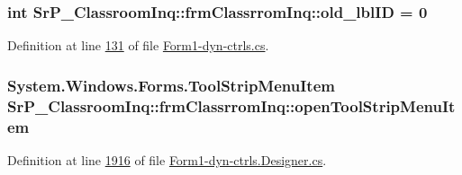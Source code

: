 \hypertarget{class_sr_p___classroom_inq_1_1frm_classrrom_inq_ac56e0f039ce0113331d9bdd322b30827}{
\subsubsection[{old\-\_\-lbl\-I\-D}]{\setlength{\rightskip}{0pt plus 5cm}int {\bf \-Sr\-P\-\_\-\-Classroom\-Inq\-::frm\-Classrrom\-Inq\-::old\-\_\-lbl\-I\-D} = 0}}
\label{class_sr_p___classroom_inq_1_1frm_classrrom_inq_ac56e0f039ce0113331d9bdd322b30827}


\-Definition at line \hyperlink{_form1-dyn-ctrls_8cs_source_l00131}{131} of file \hyperlink{_form1-dyn-ctrls_8cs_source}{\-Form1-\/dyn-\/ctrls.\-cs}.

\hypertarget{class_sr_p___classroom_inq_1_1frm_classrrom_inq_aabb3ca13577ddb31c75bcd459c075263}{
\subsubsection[{open\-Tool\-Strip\-Menu\-Item}]{\setlength{\rightskip}{0pt plus 5cm}\-System.\-Windows.\-Forms.\-Tool\-Strip\-Menu\-Item {\bf \-Sr\-P\-\_\-\-Classroom\-Inq\-::frm\-Classrrom\-Inq\-::open\-Tool\-Strip\-Menu\-Item}}}
\label{class_sr_p___classroom_inq_1_1frm_classrrom_inq_aabb3ca13577ddb31c75bcd459c075263}


\-Definition at line \hyperlink{_form1-dyn-ctrls_8_designer_8cs_source_l01916}{1916} of file \hyperlink{_form1-dyn-ctrls_8_designer_8cs_source}{\-Form1-\/dyn-\/ctrls.\-Designer.\-cs}.

